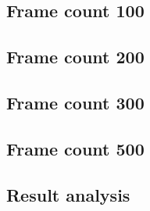 \subsection{Frame count 100}

\subsection{Frame count 200}

\subsection{Frame count 300}

\subsection{Frame count 500}

\subsection{Result analysis}
